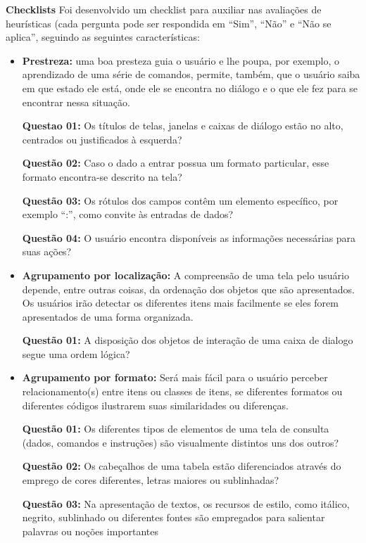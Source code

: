 \textbf{Checklists}
	Foi desenvolvido um checklist para auxiliar nas avaliações de heurísticas (cada pergunta pode ser respondida em ``Sim'', ``Não'' e ``Não se aplica'', seguindo as seguintes características:
	\begin{itemize}
		\item \textbf{Prestreza:} uma boa presteza guia o usuário e lhe poupa, por exemplo, o aprendizado de uma série de comandos, permite, também, que o usuário saiba em que estado ele está, onde ele se encontra no diálogo e o que ele fez para se encontrar nessa situação. 
		
		\textbf{Questao 01:} Os títulos de telas, janelas e caixas de diálogo estão no alto, centrados ou justificados à esquerda? 
    
    	\textbf{Questão 02:} Caso o dado a entrar possua um formato particular, esse formato encontra-se descrito na tela?
    
    	\textbf{Questão 03:} Os rótulos dos campos contêm um elemento específico, por exemplo ``:'', como convite às entradas de dados?
    
    	\textbf{Questão 04:} O usuário encontra disponíveis as informações necessárias para suas ações?  

    	\item \textbf{Agrupamento por localização:} A compreensão de uma tela pelo usuário depende, entre outras coisas, da ordenação dos objetos que são apresentados. Os usuários irão detectar os diferentes itens mais facilmente se eles forem apresentados de uma forma organizada.

    	\textbf{Questão 01:} A disposição dos objetos de interação de uma caixa de dialogo segue uma ordem lógica?
	
    	\item \textbf{Agrupamento por formato:} Será mais fácil para o usuário perceber relacionamento(s) entre itens ou classes de itens, se diferentes formatos ou diferentes códigos ilustrarem suas similaridades ou diferenças.

	
    	\textbf{Questão 01:} Os diferentes tipos de elementos de uma tela de consulta (dados, comandos e instruções) são visualmente distintos uns dos outros?
   
   		\textbf{Questão 02:} Os cabeçalhos de uma tabela estão diferenciados através do emprego de cores diferentes, letras maiores ou sublinhadas?
	   
	   	\textbf{Questão 03:} Na apresentação de textos, os recursos de estilo, como itálico, negrito, sublinhado ou diferentes fontes são empregados para salientar palavras ou noções importantes
    

\end{itemize}
